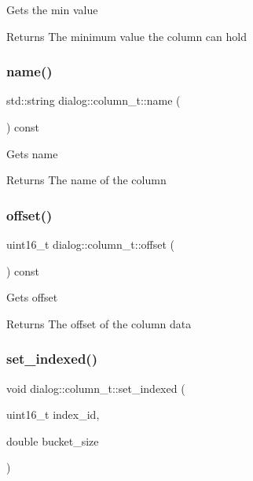 Gets the min value \begin{DoxyReturn}{Returns}
The minimum value the column can hold 
\end{DoxyReturn}
\mbox{\label{classdialog_1_1column__t_a2a5d9e2d2673082a96218bb3c5b335b2}} 
\subsubsection{\texorpdfstring{name()}{name()}}
{\footnotesize\ttfamily std\+::string dialog\+::column\+\_\+t\+::name (\begin{DoxyParamCaption}{ }\end{DoxyParamCaption}) const\hspace{0.3cm}{\ttfamily [inline]}}

Gets name \begin{DoxyReturn}{Returns}
The name of the column 
\end{DoxyReturn}
\mbox{\label{classdialog_1_1column__t_a3889fc0e609ebba20c9b323a194cade1}} 
\subsubsection{\texorpdfstring{offset()}{offset()}}
{\footnotesize\ttfamily uint16\+\_\+t dialog\+::column\+\_\+t\+::offset (\begin{DoxyParamCaption}{ }\end{DoxyParamCaption}) const\hspace{0.3cm}{\ttfamily [inline]}}

Gets offset \begin{DoxyReturn}{Returns}
The offset of the column data 
\end{DoxyReturn}
\mbox{\label{classdialog_1_1column__t_a18cbf15074f6255b63438bf64d6622bf}} 
\subsubsection{\texorpdfstring{set\+\_\+indexed()}{set\_indexed()}}
{\footnotesize\ttfamily void dialog\+::column\+\_\+t\+::set\+\_\+indexed (\begin{DoxyParamCaption}\item[{uint16\+\_\+t}]{index\+\_\+id,  }\item[{double}]{bucket\+\_\+size }\end{DoxyParamCaption})\hspace{0.3cm}{\ttfamily [inline]}}

